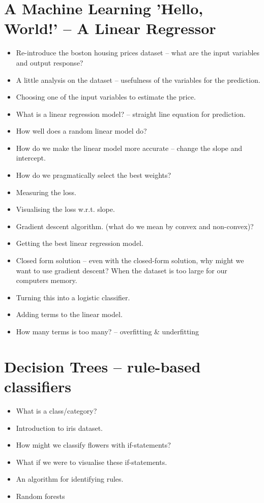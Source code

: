 \documentclass[11pt]{article}
\begin{document}
\section{A Machine Learning 'Hello, World!' -- A Linear Regressor}
\label{sec:org5486558}

\begin{itemize}
\item Re-introduce the boston housing prices dataset -- what are the input variables and
output response?
\item A little analysis on the dataset -- usefulness of the variables for the prediction.
\item Choosing one of the input variables to estimate the price.
\item What is a linear regression model? -- straight line equation for prediction.
\item How well does a random linear model do?
\item How do we make the linear model more accurate -- change the slope and intercept.
\item How do we pragmatically select the best weights?
\item Measuring the loss.
\item Visualising the loss w.r.t. slope.
\item Gradient descent algorithm. (what do we mean by convex and non-convex)?
\item Getting the best linear regression model.
\item Closed form solution -- even with the closed-form solution, why might we want to
use gradient descent? When the dataset is too large for our computers memory.
\item Turning this into a logistic classifier.
\item Adding terms to the linear model.
\item How many terms is too many? -- overfitting \& underfitting
\end{itemize}

\section{Decision Trees -- rule-based classifiers}
\label{sec:org997ce32}

\begin{itemize}
\item What is a class/category?
\item Introduction to iris dataset.
\item How might we classify flowers with if-statements?
\item What if we were to visualise these if-statements.
\item An algorithm for identifying rules.
\item Random forests
\end{itemize}
\end{document}
